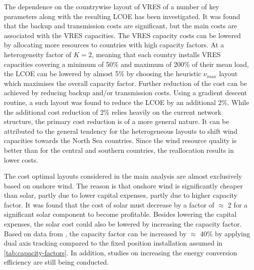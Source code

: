 \documentclass[a4paper, 5p, sort&compress]{elsarticle}%
\begin{document}
The dependence on the countrywise layout of VRES of a number of key
parameters along with the resulting LCOE has been investigated. It was
found that the backup and transmission costs are significant, but the main
costs are associated with the VRES capacities. The VRES capacity costs
can be lowered by allocating more resources to countries with high
capacity factors. At a heterogeneity factor of $K = 2$, meaning that
each country installs VRES capacities covering a minimum of 50\% and
maximum of 200\% of their mean load, the LCOE can be lowered by almost
5\% by choosing the heuristic $\nu_{max}$ layout which maximises the
overall capacity factor. Further reduction of the cost can be achieved
by reducing backup and/or transmission costs. Using a gradient descent
routine, a such layout was found to reduce the LCOE by an additional
2\%. While the additional cost reduction of 2\% relies heavily on the
current network structure, the primary cost reduction is of a more
general nature. It can be attributed to the general tendency for the
heterogeneous layouts to shift wind capacities towards the North Sea
countries. Since the wind resource quality is better than for the
central and southern countries, the reallocation results in lower
costs.



The cost optimal layouts considered in the main analysis are almost
exclusively based on onshore wind. The reason is that onshore wind is
significantly cheaper than solar, partly due to lower capital
expenses, partly due to higher capacity factor. It was found that the
cost of solar must decrease by a factor of $\approx$ 2 for a
significant solar component to become profitable. Besides lowering the
capital expenses, the solar cost could also be lowered by increasing
the capacity factor. Based on data from \cite{REA}, the capacity factor can
be increased by $\approx$ 40\% by applying dual axis tracking compared
to the fixed position installation assumed in
\cref{tab:capacity-factors}. In addition, studies on increasing the
energy conversion efficiency are still being conducted.
\end{document}
